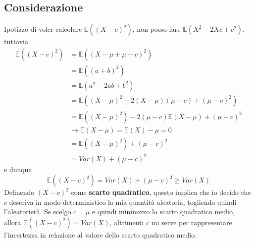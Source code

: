 \documentclass[11pt]{report}
\begin{document}
\subsection{Considerazione}
Ipotizzo di voler calcolare $\mathbb{E}((X-c)^2)$, non posso fare $\mathbb{E}(X^2 - 2Xc + c^2)$, tuttavia
\begin{equation}
    \begin{split}
        \mathbb{E}((X-c)^2) & = \mathbb{E}((X - \mu + \mu - c)^2)\\
        & = \mathbb{E}((a + b)^2)\\
        & = \mathbb{E}(a^2 - 2ab + b^2)\\
        & = \mathbb{E}((X - \mu)^2 - 2(X - \mu)(\mu - c) + (\mu -c)^2)\\
        & = \mathbb{E}((X - \mu)^2) - 2(\mu - c)\mathbb{E}(X - \mu) + (\mu -c)^2\\
        & \rightarrow \mathbb{E}(X - \mu) = \mathbb{E}(X) - \mu = 0\\
        & = \mathbb{E}((X - \mu)^2) + (\mu - c)^2\\
        & = Var(X) + (\mu - c)^2
    \end{split}
\end{equation}
e dunque
\begin{equation}
    \mathbb{E}((X-c)^2) = Var(X) + (\mu - c)^2 \geq Var(X)
\end{equation}
Definendo $(X-c)^2$ come \textbf{scarto quadratico}, questo implica che io decido che $c$ descriva in modo deterministico la mia quantità aleatoria, togliendo quindi l'aleatorietà. Se scelgo $c=\mu$ e quindi minimizzo lo scarto quadratico medio, allora $\mathbb{E}((X-c)^2) = Var(X)$, altrimenti $c$ mi serve per rappresentare l'incertezza in relazione al valore dello scarto quadratico medio.
\end{document}
